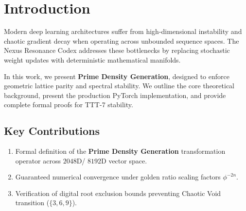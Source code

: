 \section{Introduction}
Modern deep learning architectures suffer from high-dimensional instability and chaotic gradient decay when operating across unbounded sequence spaces. The Nexus Resonance Codex addresses these bottlenecks by replacing stochastic weight updates with deterministic mathematical manifolds.

In this work, we present \textbf{Prime Density Generation}, designed to enforce geometric lattice parity and spectral stability. We outline the core theoretical background, present the production PyTorch implementation, and provide complete formal proofs for TTT-7 stability.

\subsection{Key Contributions}
\begin{enumerate}[label=\textbf{\arabic*.}]
    \item Formal definition of the \textbf{Prime Density Generation} transformation operator across $2048$D/ $8192$D vector space.
    \item Guaranteed numerical convergence under golden ratio scaling factors $\phi^{-2n}$.
    \item Verification of digital root exclusion bounds preventing Chaotic Void transition ($\{3, 6, 9\}$).
\end{enumerate}